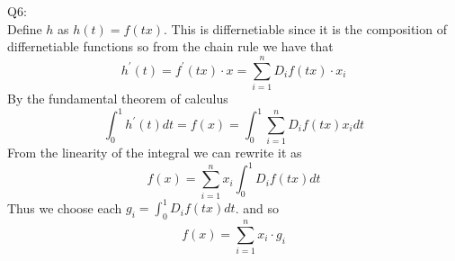 \documentclass[letterpaper]{article}
\begin{document}
 
Q6:\\
Define $h$ as $h(t) = f(tx)$. This is differnetiable since it is the composition of differnetiable functions so from the chain rule we have that $$h^\prime (t) = f^\prime (tx) \cdot x = \sum_{i=1}^n D_i f(tx) \cdot x_i$$
By the fundamental theorem of calculus $$\int_0^1 h^\prime(t) dt = f(x) = \int_0^1 \sum_{i=1}^n D_i f(tx) x_i dt$$ 
From the linearity of the integral we can rewrite it as $$f(x) = \sum_{i=1}^n x_i  \int_0^1 D_i f(tx) dt$$ Thus we choose each $g_i = \int_0^1 D_i f(tx) dt$. and so $$f(x) = \sum_{i=1}^n x_i \cdot g_i $$
\end{document}
